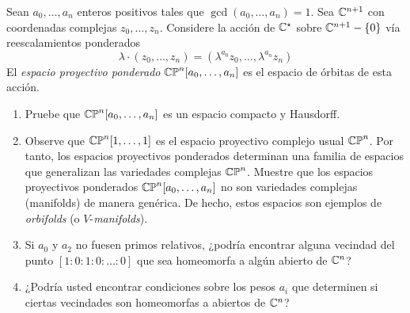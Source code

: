 \begin{exercise}
Sean $a_0, \dots, a_n$ enteros positivos tales que $\gcd(a_0, \dots, a_n) = 1$. Sea $\mathbb C^{n+1}$ con coordenadas complejas $z_0, \dots, z_n$. Considere la acción de $\mathbb C^\star$ sobre $\mathbb C^{n+1} - \{ 0 \}$ vía reescalamientos ponderados
$$\lambda \cdot (z_0, \dots, z_n) = (\lambda^{a_0} z_0, \dots, \lambda^{a_n} z_n)$$
El \textit{espacio proyectivo ponderado} $\mathbb {CP}^n[a_0, \dots, a_n]$ es el espacio de órbitas de esta acción.
\begin{enumerate}[label=\alph*)]
    \item Pruebe que $\mathbb {CP}^n[a_0, \dots, a_n]$ es un espacio compacto y Hausdorff.
    
    \item Observe que $\mathbb {CP}^n[1, \dots, 1]$ es el espacio proyectivo complejo usual $\mathbb {CP}^n$. Por tanto, los espacios proyectivos ponderados determinan una familia de espacios que generalizan las variedades complejas $\mathbb {CP}^n$. Muestre que los espacios proyectivos ponderados $\mathbb {CP}^n[a_0, \dots, a_n]$ no son variedades complejas (manifolds) de manera genérica. De hecho, estos espacios son ejemplos de \textit{orbifolds} (o $V$-\textit{manifolds}).
    
    \item Si $a_0$ y $a_2$ no fuesen primos relativos, ¿podría encontrar alguna vecindad del punto $[1:0:1:0:\dots:0]$ que sea homeomorfa a algún abierto de $\mathbb C^n$?
    
    \item ¿Podría usted encontrar condiciones sobre los pesos $a_i$ que determinen si ciertas vecindades son homeomorfas a abiertos de $\mathbb C^n$?
\end{enumerate}
\end{exercise}
